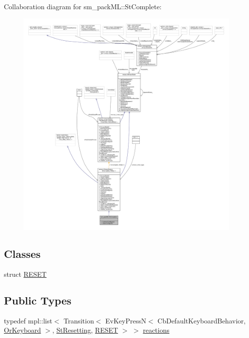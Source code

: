 Collaboration diagram for sm\+\_\+pack\+ML\+:\+:St\+Complete\+:
\nopagebreak
\begin{figure}[H]
\begin{center}
\leavevmode
\includegraphics[width=350pt]{structsm__packML_1_1StComplete__coll__graph}
\end{center}
\end{figure}
\subsection*{Classes}
\begin{DoxyCompactItemize}
\item 
struct \hyperlink{structsm__packML_1_1StComplete_1_1RESET}{R\+E\+S\+ET}
\end{DoxyCompactItemize}
\subsection*{Public Types}
\begin{DoxyCompactItemize}
\item 
typedef mpl\+::list$<$ Transition$<$ Ev\+Key\+PressN$<$ Cb\+Default\+Keyboard\+Behavior, \hyperlink{classsm__packML_1_1OrKeyboard}{Or\+Keyboard} $>$, \hyperlink{structsm__packML_1_1StResetting}{St\+Resetting}, \hyperlink{structsm__packML_1_1StComplete_1_1RESET}{R\+E\+S\+ET} $>$ $>$ \hyperlink{structsm__packML_1_1StComplete_a37887e4ae44b8c4c4d6081fe95b52bdc}{reactions}
\end{DoxyCompactItemize}
